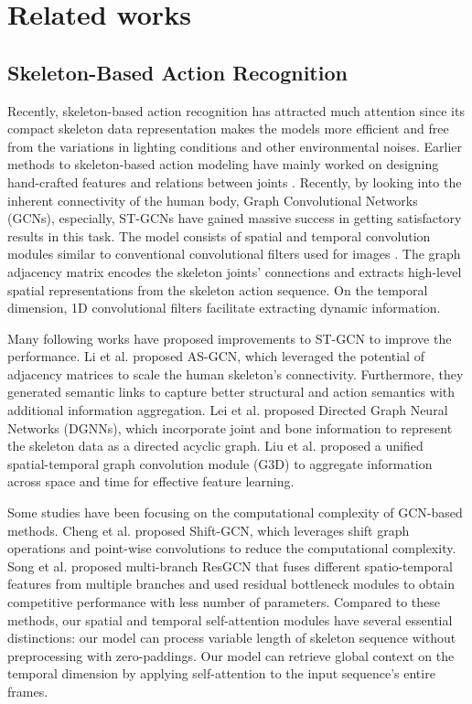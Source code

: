 \documentclass[letterpaper]{article} %
\begin{document}
\section{Related works}
\subsection{Skeleton-Based Action Recognition}
Recently, skeleton-based action recognition has attracted much attention since its compact skeleton data representation makes the models more efficient and free from the variations in lighting conditions and other environmental noises. Earlier methods to skeleton-based action modeling have mainly worked on designing hand-crafted features and relations between joints \cite{}. %
Recently, by looking into the inherent connectivity of the human body, Graph Convolutional Networks (GCNs), especially, ST-GCNs have gained massive success in getting satisfactory results in this task. The model consists of spatial and temporal convolution modules similar to conventional convolutional filters used for images \cite{yan2018spatial}. The graph adjacency matrix encodes the skeleton joints' connections and extracts high-level spatial representations from the skeleton action sequence. On the temporal dimension, 1D convolutional filters facilitate extracting dynamic information.

Many following works have proposed improvements to ST-GCN to improve the performance. Li et al. \cite{Li_2019_CVPR} proposed AS-GCN, which leveraged the potential of adjacency matrices to scale the human skeleton's connectivity. Furthermore, they generated semantic links to capture better structural and action semantics with additional information aggregation. Lei et al. \cite{shi2019skeleton} proposed Directed Graph Neural Networks (DGNNs), which incorporate joint and bone information to represent the skeleton data as a directed acyclic graph. Liu et al. \cite{liu2020disentangling} proposed a unified spatial-temporal graph convolution module (G3D) to aggregate information across space and time for effective feature learning.

Some studies have been focusing on the computational complexity of GCN-based methods. Cheng et al. \cite{cheng2020shiftgcn} proposed Shift-GCN, which leverages shift graph operations and point-wise convolutions to reduce the computational complexity. Song et al. \cite{song2020stronger} proposed multi-branch ResGCN that fuses different spatio-temporal features from multiple branches and used residual bottleneck modules to obtain competitive performance with less number of parameters. Compared to these methods, our spatial and temporal self-attention modules have several essential distinctions: our model can process variable length of skeleton sequence without preprocessing with zero-paddings. Our model can retrieve global context on the temporal dimension by applying self-attention to the input sequence's entire frames.
\end{document}
